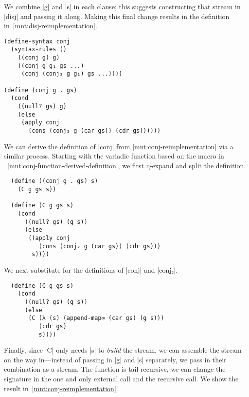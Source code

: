 \documentclass[sigplan,screen,draft,anonymous,review,natbib=false]{acmart}
\begin{document}
\noindent We combine \rackinline|g| and \rackinline|s| in each clause;
this suggests constructing that stream in \rackinline|disj| and
passing it along. Making this final change results in the definition
in~\cref{mnt:disj-reimplementation}.


\begin{listing}[h]
\begin{verbatim}
(define-syntax conj
  (syntax-rules ()
    ((conj g) g)
    ((conj g g₁ gs ...)
     (conj (conj₂ g g₁) gs ...))))

(define (conj g . gs)
  (cond
    ((null? gs) g)
    (else
     (apply conj
       (cons (conj₂ g (car gs)) (cdr gs))))))
\end{verbatim}
  \caption{\rackinline|conj₂|-based \rackinline|conj| function and macro.}
  \label{mnt:conj-function-derived-definition}
\end{listing}

We can derive the definition of \rackinline|conj| from
\cref{mnt:conj-reimplementation} via a similar process. Starting with
the variadic function based on the macro in
~\cref{mnt:conj-function-derived-definition}, we first η-expand and
split the definition.

\begin{listing}[h]
\begin{verbatim}
  (define ((conj g . gs) s)
    (C g gs s))

  (define (C g gs s)
    (cond
      ((null? gs) (g s))
      (else
       ((apply conj
          (cons (conj₂ g (car gs)) (cdr gs)))
        s))))
\end{verbatim}
  \caption{Derivation of split \rackinline|conj| function definition.}
  \label{mnt:conj-substituted-through}
\end{listing}
\noindent We next substitute for the definitions of \rackinline|conj| and
\rackinline|conj₂|.

\begin{listing}[h]
\begin{verbatim}
  (define (C g gs s)
    (cond
      ((null? gs) (g s))
      (else
       (C (λ (s) (append-map∞ (car gs) (g s)))
          (cdr gs)
          s))))
\end{verbatim}
  \caption{Replacing \rackinline|apply| in \rackinline|C| function definition.}
  \label{mnt:C-substituted-through}
\end{listing}

Finally, since \rackinline|C| only needs \rackinline|s| to
\emph{build} the stream, we can assemble the stream on the way
in---instead of passing in \rackinline|g| and \rackinline|s|
separately, we pass in their combination as a stream. The function is
tail recursive, we can change the signature in the one and only
external call and the recursive call. We show the result
in~\cref{mnt:conj-reimplementation}.
\end{document}
